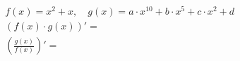 \documentclass[aspectratio=169]{beamer}
\begin{document}
\begin{frame}
  \begin{align*}
    & f(x) = x^2 + x ,  \quad g(x) = a \cdot x^{10} + b \cdot x^5 + c \cdot x^2 + d \\[1em]
    & \left(  f(x) \cdot g(x) \right)' =  \\[3em]
    & \left(  \frac{g(x)}{f(x)} \right)' =
  \end{align*}
\end{frame}
\end{document}
